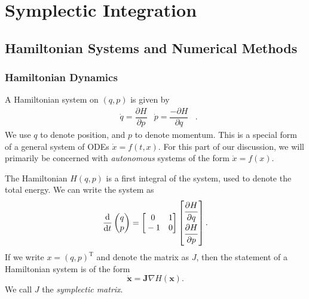 \documentclass{report}
\theoremstyle{exampstyle} \newtheorem{example}[theorem]{Example}
\theoremstyle{exampstyle} \newtheorem{remark}[theorem]{Remark}
\theoremstyle{exampstyle} \newtheorem{definition}[theorem]{Definition}
\theoremstyle{exampstyle} \newtheorem{lemma}[theorem]{Lemma}
\theoremstyle{exampstyle} \newtheorem{proposition}[theorem]{Proposition}
\begin{document}
\chapter{Symplectic Integration}

\section{Hamiltonian Systems and Numerical Methods}

\subsection{Hamiltonian Dynamics}

A Hamiltonian system on $(q,p)$ is given by
\begin{align*}
	&\dot{q} = \dfrac{\partial H}{\partial p}
	&
	\dot{p} = \dfrac{-\partial H}{\partial q}&.	
\end{align*}
We use $q$ to denote position, and $p$ to denote momentum.
This is a special form of a general system of ODEs $\dot{x} = f(t,x)$.
For this part of our discussion, we will primarily be concerned with \textit{autonomous} systems of the form $\dot{x} = f(x)$.

The Hamiltonian $H(q,p)$ is a first integral of the system, used to denote the total energy.
We can write the system as
\begin{equation}
	\dfrac{\mathrm{d}}{\mathrm{d}t}\begin{pmatrix}
		q \\
		p
	\end{pmatrix} = \begin{bmatrix}
		\strut 0 & \strut 1 \\
		\strut -1 & \strut 0
	\end{bmatrix}\begin{bmatrix}
	\dfrac{\strut \partial H}{\strut\partial q} \\
	\dfrac{\strut \partial H}{\strut\partial p}
	\end{bmatrix}.
\end{equation}
If we write $x = (q,p)^\mathrm{T}$ and denote the matrix as $J$,
then the statement of a Hamiltonian system is of the form 
\begin{equation}
	\mathbf{\dot{x}} = \mathbf{J}\nabla H(\mathbf{x}).
	\label{eqn:hdyn}
\end{equation}
We call $J$ the \textit{symplectic matrix}.
\end{document}
